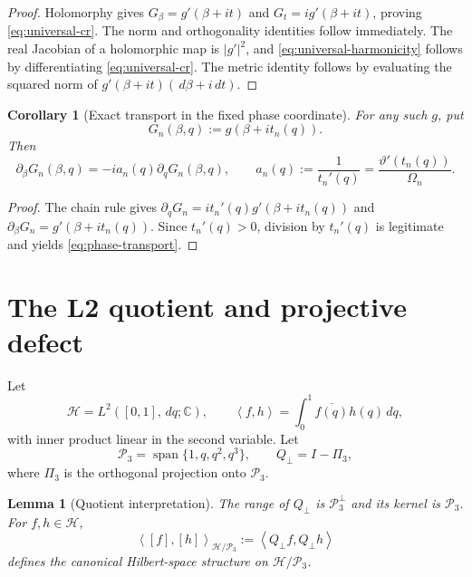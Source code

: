 \documentclass[11pt]{amsart}
\numberwithin{equation}{section}
\newtheorem{corollary}[theorem]{Corollary}
\newtheorem{lemma}[theorem]{Lemma}
\newcommand{\C}{\mathbb C}
\newcommand{\Hcal}{\mathcal H}
\newcommand{\Pcal}{\mathcal P}
\newcommand{\dd}{\,d}
\newcommand{\ip}[2]{\left\langle #1,#2\right\rangle}
\begin{document}
\begin{proof}
Holomorphy gives
$G_\beta=g'(\beta+it)$ and $G_t=i g'(\beta+it)$, proving
\eqref{eq:universal-cr}.  The norm and orthogonality identities follow
immediately.  The real Jacobian of a holomorphic map is $|g'|^2$, and
\eqref{eq:universal-harmonicity} follows by differentiating
\eqref{eq:universal-cr}.  The metric identity follows by evaluating the
squared norm of
$g'(\beta+it)(\dd\beta+i\dd t)$.
\end{proof}

\begin{corollary}[Exact transport in the fixed phase coordinate]
\label{cor:phase-transport}
For any such $g$, put
\begin{equation}
 G_n(\beta,q):=g(\beta+i t_n(q)).
 \label{eq:Gn-definition}
\end{equation}
Then
\begin{equation}
 \boxed{
 \partial_\beta G_n(\beta,q)
 =-i a_n(q)\partial_qG_n(\beta,q),
 \qquad
 a_n(q):=\frac1{t_n'(q)}
 =\frac{\vartheta'(t_n(q))}{\Omega_n}.
 }
 \label{eq:phase-transport}
\end{equation}
\end{corollary}

\begin{proof}
The chain rule gives
$\partial_qG_n=i t_n'(q)g'(\beta+i t_n(q))$ and
$\partial_\beta G_n=g'(\beta+i t_n(q))$.  Since $t_n'(q)>0$,
division by $t_n'(q)$ is legitimate and yields
\eqref{eq:phase-transport}.
\end{proof}

\section{The L2 quotient and projective defect}
\label{sec:l2-quotient}

Let
\begin{equation}
 \Hcal=L^2([0,1],\dd q;\C),
 \qquad
 \ip{f}{h}=\int_0^1\overline{f(q)}h(q)\dd q,
 \label{eq:Hilbert-space}
\end{equation}
with inner product linear in the second variable.  Let
\begin{equation}
 \Pcal_3=\operatorname{span}\{1,q,q^2,q^3\},
 \qquad
 Q_\perp=I-\Pi_3,
 \label{eq:Qperp-definition}
\end{equation}
where $\Pi_3$ is the orthogonal projection onto $\Pcal_3$.

\begin{lemma}[Quotient interpretation]
\label{lem:quotient-interpretation}
The range of $Q_\perp$ is $\Pcal_3^\perp$ and its kernel is $\Pcal_3$.
For $f,h\in\Hcal$,
\begin{equation}
 \ip{[f]}{[h]}_{\Hcal/\Pcal_3}
 :=\ip{Q_\perp f}{Q_\perp h}
 \label{eq:quotient-inner-product}
\end{equation}
defines the canonical Hilbert-space structure on $\Hcal/\Pcal_3$.
\end{lemma}
\end{document}
